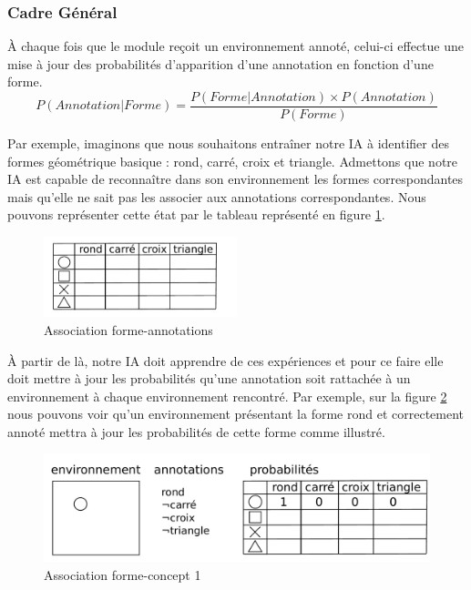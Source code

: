 
\subsubsection{Cadre Général}


À chaque fois que le module reçoit un environnement annoté, celui-ci effectue une mise à jour des probabilités d'apparition d'une annotation en fonction d'une forme.
\[ P(Annotation|Forme) = \frac{P(Forme|Annotation) \times P(Annotation)}{P(Forme)} \]

Par exemple, imaginons que nous souhaitons entraîner notre IA à identifier des formes géométrique basique : rond, carré, croix et triangle. Admettons que notre IA est capable de reconnaître dans son environnement les formes correspondantes mais qu'elle ne sait pas les associer aux annotations correspondantes. Nous pouvons représenter cette état par le tableau représenté en figure \ref{img_annotations}.

\begin{figure}[H] 
  \begin{center}
    \includegraphics[width=0.5\textwidth]{files/raisonneur/annotations} 
  \end{center}
\caption{Association forme-annotations} 
\label{img_annotations}
\end{figure}

À partir de là, notre IA doit apprendre de ces expériences et pour ce faire elle doit mettre à jour les probabilités qu'une annotation soit rattachée à un environnement à chaque environnement rencontré. Par exemple, sur la figure \ref{img_annotations_1} nous pouvons voir qu'un environnement présentant la forme \og{} rond \fg{} et correctement annoté mettra à jour les probabilités de cette forme comme illustré.

\begin{figure}[H] 
\includegraphics[width=\textwidth]{files/raisonneur/annotations_1} 
\caption{Association forme-concept 1} 
\label{img_annotations_1}
\end{figure}


